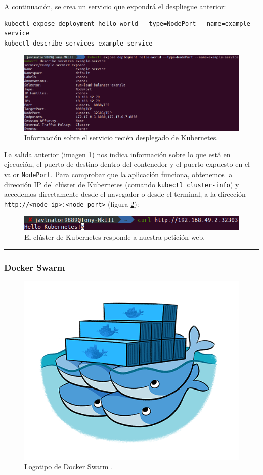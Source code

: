 A continuación, se crea un servicio que expondrá el despliegue anterior:

\begin{lstlisting}[style=bash, caption={}]
kubectl expose deployment hello-world --type=NodePort --name=example-service
kubectl describe services example-service
\end{lstlisting}

\begin{figure}[H]
    \centering
    \includegraphics[width=.9\linewidth]{pictures/k8s-service.png}
    \caption{Información sobre el servicio recién desplegado de Kubernetes.}
    \label{fig:k8s-service}
\end{figure}

La salida anterior (imagen \ref{fig:k8s-service}) nos indica información sobre
lo que está en ejecución, el puerto de destino dentro del contenedor y el
puerto expuesto en el valor \texttt{NodePort}. Para comprobar que la aplicación
funciona, obtenemos la dirección IP del clúster de Kubernetes (comando
\lstinline[style=bash]!kubectl cluster-info!) y accedemos directamente desde
el navegador o desde el terminal, a la dirección \texttt{http://<node-ip>:<node-port>}
(figura \ref{fig:hello-k8s}):

\begin{figure}[H]
    \centering
    \includegraphics[width=.5\linewidth]{pictures/hello-kubernetes.png}
    \caption{El clúster de Kubernetes responde a nuestra petición web.}
    \label{fig:hello-k8s}
\end{figure}

\noindent\rule{\linewidth}{.2pt}

\subsubsection*{Docker Swarm}
\begin{figure}[H]
    \centering
    \includegraphics[width=.5\linewidth]{pictures/swarm-logo.png}
    \caption{Logotipo de Docker Swarm \autocite{Swarm}.}
    \label{fig:docker-logo}
\end{figure}

